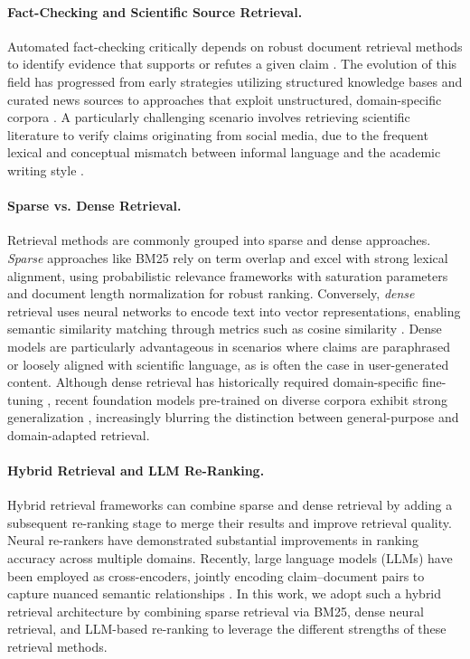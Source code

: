 %
%
\paragraph{Fact-Checking and Scientific Source Retrieval.}
Automated fact-checking critically depends on robust document retrieval methods to identify evidence that supports or refutes a given claim \cite{thorne_fever_2018}. The evolution of this field has progressed from early strategies utilizing structured knowledge bases and curated news sources \cite{vlachos_fact_2014} to approaches that exploit unstructured, domain-specific corpora \cite{wadden_fact_2020}. A particularly challenging scenario involves retrieving scientific literature to verify claims originating from social media, due to the frequent lexical and conceptual mismatch between informal language and the academic writing style \cite{wadden_scifact-open_2022, arampatzis_overview_2023, goeuriot_overview_2024}.

\paragraph{Sparse vs. Dense Retrieval.}
Retrieval methods are commonly grouped into sparse and dense approaches.
\emph{Sparse} approaches like BM25 \cite{robertson_relevance_1976, robertson_probabilistic_2009} rely on term overlap and excel with strong lexical alignment, using probabilistic relevance frameworks with saturation parameters and document length normalization for robust ranking.
Conversely, \emph{dense} retrieval uses neural networks to encode text into vector representations, enabling semantic similarity matching through metrics such as cosine similarity \cite{karpukhin_dense_2020, izacard_leveraging_2021}. Dense models are particularly advantageous in scenarios where claims are paraphrased or loosely aligned with scientific language, as is often the case in user-generated content. 
 Although dense retrieval has historically required domain-specific fine-tuning \cite{lee_learning_2021, maillard_multi-task_2021}, recent foundation models pre-trained on diverse corpora exhibit strong generalization \cite{infly-ai_inf-retriever-v1_nodate}, increasingly blurring the distinction between general-purpose and domain-adapted retrieval.

\paragraph{Hybrid Retrieval and LLM Re-Ranking.}
Hybrid retrieval frameworks can combine sparse and dense retrieval by adding a subsequent re-ranking stage to merge their results and improve retrieval quality. Neural re-rankers \cite{nogueira_passage_2019} have demonstrated substantial improvements in ranking accuracy across multiple domains. Recently, large language models (LLMs) have been employed as cross-encoders, jointly encoding claim–document pairs to capture nuanced semantic relationships \cite{li_making_2023, chen_m3-embedding_2024}.
In this work, we adopt such a hybrid retrieval architecture by combining sparse retrieval via BM25, dense neural retrieval, and LLM-based re-ranking to leverage the different strengths of these retrieval methods.